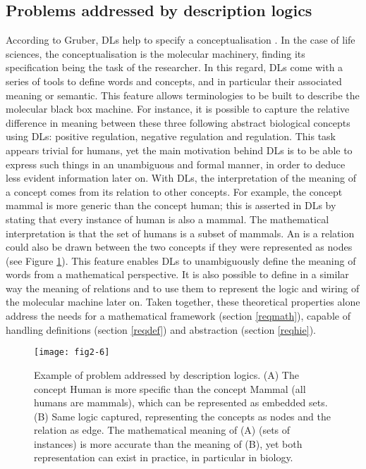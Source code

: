 \subsection{Problems addressed by description logics}

According to Gruber, DLs help to specify a conceptualisation \citep{gruber2009encyclopedia}. In the case of life sciences, the conceptualisation is the molecular machinery, finding its specification being the task of the researcher. In this regard, DLs come with a series of tools to define words and concepts, and in particular their associated meaning or semantic. This feature allows terminologies to be built to describe the molecular black box machine. For instance, it is possible to capture the relative difference in meaning between these three following abstract biological concepts using DLs: positive regulation, negative regulation and regulation. This task appears trivial for humans, yet the main motivation behind DLs is to be able to express such things in an unambiguous and formal manner, in order to deduce less evident information later on. With DLs, the interpretation of the meaning of a concept comes from its relation to other concepts. For example, the concept mammal is more generic than the concept human; this is asserted in DLs by stating that every instance of human is also a mammal. The mathematical interpretation is that the set of humans is a subset of mammals. An is a relation could also be drawn between the two concepts if they were represented as nodes (see Figure \ref{fig2-6}). This feature enables DLs to unambiguously define the meaning of words from a mathematical perspective. It is also possible to define in a similar way the meaning of relations and to use them to represent the logic and wiring of the molecular machine later on. Taken together, these theoretical properties alone address the needs for a mathematical framework (section \ref{reqmath}), capable of handling definitions (section \ref{reqdef}) and abstraction (section \ref{reqhie}).

\begin{figure}[ht]
    \centering
    \texttt{[image: fig2-6]}
    \caption{Example of problem addressed by description logics. (A) The concept Human is more specific than the concept Mammal (all humans are mammals), which can be represented as embedded sets. (B) Same logic captured, representing the concepts as nodes and the relation as edge. The mathematical meaning of (A) (sets of instances) is more accurate than the meaning of (B), yet both representation can exist in practice, in particular in biology.}
    \label{fig2-6}
\end{figure}

